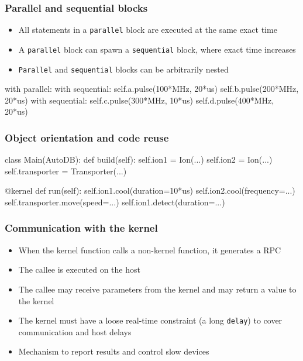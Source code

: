 \documentclass{beamer}
\begin{document}
\begin{frame}[fragile]
\frametitle{\selectfont Parallel and sequential blocks}
\begin{itemize}
\item All statements in a \verb!parallel! block are executed at the same exact time
\item A \verb!parallel! block can spawn a \verb!sequential! block, where exact time increases
\item \verb!Parallel! and \verb!sequential! blocks can be arbitrarily nested
\end{itemize}
\begin{verbatimtab}
with parallel:
    with sequential:
        self.a.pulse(100*MHz, 20*us)
        self.b.pulse(200*MHz, 20*us)
    with sequential:
        self.c.pulse(300*MHz, 10*us)
        self.d.pulse(400*MHz, 20*us)
\end{verbatimtab}
\end{frame}

\begin{frame}[fragile]
\frametitle{\selectfont Object orientation and code reuse}
\begin{verbatimtab}
class Main(AutoDB):
    def build(self):
        self.ion1 = Ion(...)
        self.ion2 = Ion(...)
        self.transporter = Transporter(...)

    @kernel
    def run(self):
        self.ion1.cool(duration=10*us)
        self.ion2.cool(frequency=...)
        self.transporter.move(speed=...)
        self.ion1.detect(duration=...)
\end{verbatimtab}
\end{frame}

\begin{frame}[fragile]
\frametitle{\selectfont Communication with the kernel}
\begin{itemize}
\item When the kernel function calls a non-kernel function, it generates a RPC
\item The callee is executed on the host
\item The callee may receive parameters from the kernel and may return a value to the kernel
\item The kernel must have a loose real-time constraint (a long \verb!delay!) to cover communication and host delays
\item Mechanism to report results and control slow devices
\end{itemize}
\end{frame}
\end{document}
